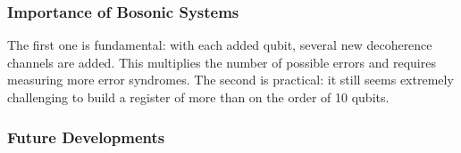 \documentclass[12]{amsart}
\newcommand\0{\mathbf{0}}
\newcommand\<{\langle}
\renewcommand\>{\rangle}
\begin{document}
\subsubsection{Importance of Bosonic Systems}

The first one is fundamental: with each added qubit, several new decoherence channels are added. This multiplies the number of possible errors and requires measuring more error syndromes. The second is practical: it still seems extremely challenging to build a register of more than on the order of 10 qubits.

\subsubsection{Future Developments}

\nocite{*}


\end{document}
